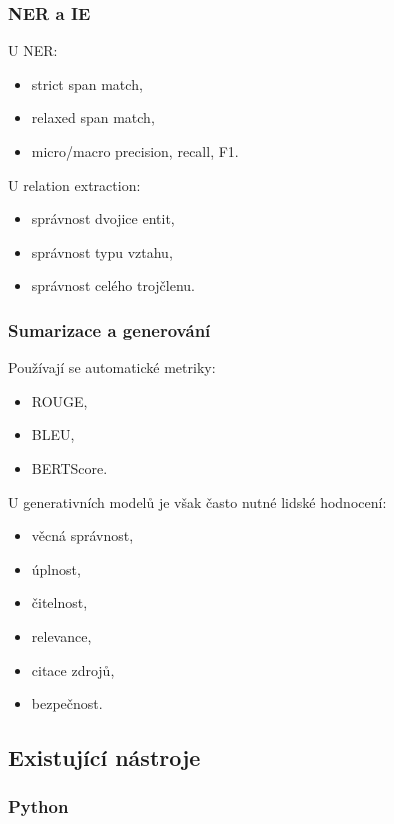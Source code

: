 \subsubsection{NER a IE}

U NER:
\begin{itemize}
    \item strict span match,
    \item relaxed span match,
    \item micro/macro precision, recall, F1.
\end{itemize}

U relation extraction:
\begin{itemize}
    \item správnost dvojice entit,
    \item správnost typu vztahu,
    \item správnost celého trojčlenu.
\end{itemize}

\subsubsection{Sumarizace a generování}

Používají se automatické metriky:
\begin{itemize}
    \item ROUGE,
    \item BLEU,
    \item BERTScore.
\end{itemize}

U generativních modelů je však často nutné lidské hodnocení:
\begin{itemize}
    \item věcná správnost,
    \item úplnost,
    \item čitelnost,
    \item relevance,
    \item citace zdrojů,
    \item bezpečnost.
\end{itemize}

\subsection{Existující nástroje}

\subsubsection{Python}

